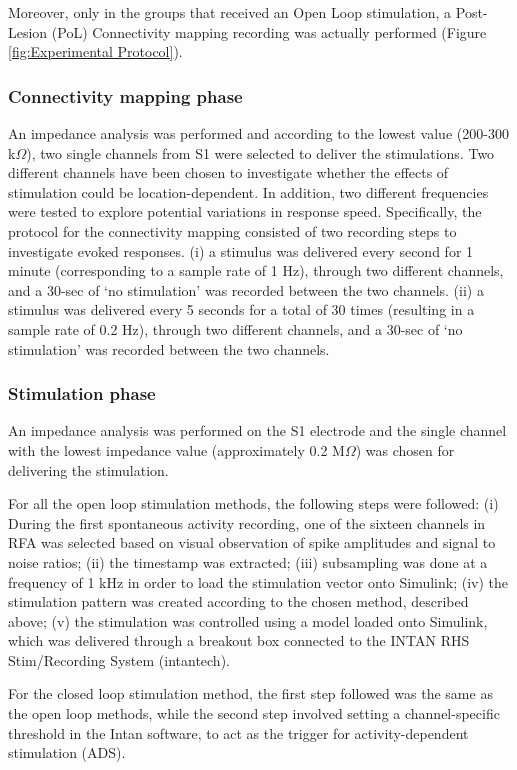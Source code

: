 Moreover, only in the groups that received an Open Loop stimulation, a Post-Lesion (PoL) Connectivity mapping recording was actually performed (Figure \ref{fig:Experimental Protocol}).

\subsubsection{Connectivity mapping phase}

An impedance analysis was performed and according to the lowest value (200-300 k$\Omega$), two single channels from S1 were selected to deliver the stimulations. Two different channels have been chosen to investigate whether the effects of stimulation could be location-dependent. In addition, two different frequencies were tested to explore potential variations in response speed. Specifically, the protocol for the connectivity mapping consisted of two recording steps to investigate evoked responses. (i) a stimulus was delivered every second for 1 minute (corresponding to a sample rate of 1 Hz), through two different channels, and a 30-sec of ‘no stimulation’ was recorded between the two channels. (ii) a stimulus was delivered every 5 seconds for a total of 30 times (resulting in a sample rate of 0.2 Hz), through two different channels, and a 30-sec of ‘no stimulation’ was recorded between the two channels.

\subsubsection{Stimulation phase}

An impedance analysis was performed on the S1 electrode and the single channel with the lowest impedance value (approximately 0.2 M$\Omega$) was chosen for delivering the stimulation.

For all the open loop stimulation methods, the following steps were followed: (i) During the first spontaneous activity recording, one of the sixteen channels in RFA was selected based on visual observation of spike amplitudes and signal to noise ratios; (ii) the timestamp was extracted; (iii) subsampling was done at a frequency of 1 kHz in order to load the stimulation vector onto Simulink; (iv) the stimulation pattern was created according to the chosen method, described above; (v) the stimulation was controlled using a model loaded onto Simulink, which was delivered through a breakout box connected to the INTAN RHS Stim/Recording System (intantech).

For the closed loop stimulation method, the first step followed was the same as the open loop methods, while the second step involved setting a channel-specific threshold in the Intan software, to act as the trigger for activity-dependent stimulation (ADS).

